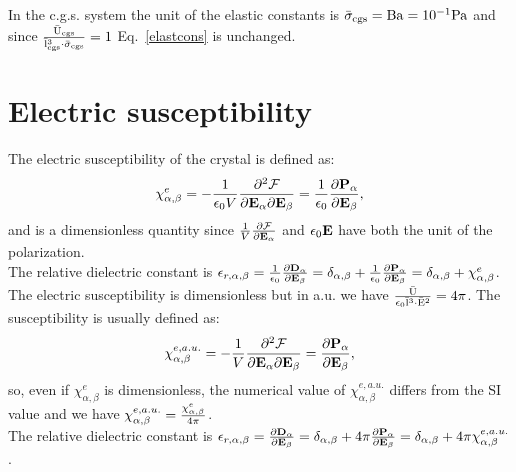 \documentclass[12pt,a4paper,twoside]{report}
\begin{document}
{\color{orange} In the c.g.s. system the unit of the elastic constants
is ${\rm \bar \sigma_{cgs}}={\rm Ba}=10^{-1} {\rm Pa}$ and since ${{\rm \bar U_{cgs}} \over 
{\rm \bar l_{cgs}}^3\cdot {\rm \bar \sigma_{cgs}}}=1$ Eq.~\ref{elastcons} is unchanged.
\\
}

\newpage
{\color{coral}\section{Electric susceptibility}}
\color{black}

The electric susceptibility of the crystal is defined as:
\begin{equation}
\chi^e_{\alpha,\beta}=-{1\over \epsilon_0 V} 
{\partial^2 \mathcal{F} \over \partial 
{\bf E}_{\alpha} \partial {\bf E}_{\beta}}= {1\over \epsilon_0}
{\partial {\bf P}_\alpha \over \partial {\bf E}_{\beta}},
\end{equation}
and is a dimensionless quantity since ${1\over V} 
{\partial \mathcal{F} \over \partial 
{\bf E}_{\alpha}}$ and $\epsilon_0 {\bf E}$ have both the unit of
the polarization.\\
The relative dielectric constant is $\epsilon_{r,\alpha,\beta}=
{1\over \epsilon_0} {\partial {\bf D}_{\alpha} \over \partial {\bf E}_{\beta}}=
\delta_{\alpha,\beta} 
+{1\over \epsilon_0} {\partial {\bf P}_\alpha \over \partial {\bf E}_\beta} = 
\delta_{\alpha,\beta} + 
\chi^e_{\alpha,\beta}$.
\\

{\color{web-blue} The electric susceptibility is dimensionless but
in a.u. we have
${{\rm \bar U} \over \epsilon_0 {\rm \bar l}^3 \cdot {\rm \bar E}^2}=4\pi$. 
The susceptibility is usually defined as:
\begin{equation}
\chi^{e,a.u.}_{\alpha,\beta}=-{1\over V} 
{\partial^2 \mathcal{F} \over \partial 
{\bf E}_{\alpha} \partial {\bf E}_{\beta}}= 
{\partial {\bf P}_\alpha \over \partial {\bf E}_\beta}, 
\end{equation}
so, even if $\chi^e_{\alpha,\beta}$ is dimensionless,  
the numerical value of $\chi^{e,a.u.}_{\alpha,\beta}$ differs from the
SI value and we have
$\chi^{e,a.u.}_{\alpha,\beta} = {\chi^e_{\alpha,\beta} \over 4 \pi}$. \\
The relative dielectric constant is $\epsilon_{r,\alpha,\beta}=
{\partial {\bf D}_{\alpha} \over \partial {\bf E}_{\beta}}=
\delta_{\alpha,\beta} 
+4 \pi {\partial {\bf P}_\alpha \over \partial {\bf E}_\beta} = 
\delta_{\alpha,\beta} + 
4\pi \chi^{e,a.u.}_{\alpha,\beta}$.
}
\\
\end{document}
